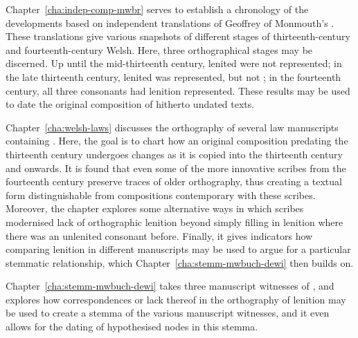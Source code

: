 Chapter~\ref{cha:indep-comp-mwbr} serves to establish a chronology of the developments based on independent translations of Geoffrey of Monmouth's . These translations give various snapshots of different stages of thirteenth-century and fourteenth-century Welsh. Here, three orthographical stages may be discerned. Up until the mid-thirteenth century, lenited  were not represented; in the late thirteenth century, lenited  was represented, but not ; in the fourteenth century, all three consonants had lenition represented. These results may be used to date the original composition of hitherto undated texts.

Chapter~\ref{cha:welsh-laws} discusses the orthography of several law manuscripts containing . Here, the goal is to chart how an original composition predating the thirteenth century undergoes changes as it is copied into the thirteenth century and onwards. It is found that even some of the more innovative scribes from the fourteenth century preserve traces of older orthography, thus creating a textual form distinguishable from compositions contemporary with these scribes. Moreover, the chapter explores some alternative ways in which scribes modernised lack of orthographic lenition beyond simply filling in lenition where there was an unlenited consonant before. Finally, it gives indicators how comparing lenition in different manuscripts may be used to argue for a particular stemmatic relationship, which Chapter~\ref{cha:stemm-mwbuch-dewi} then builds on.

Chapter~\ref{cha:stemm-mwbuch-dewi} takes three manuscript witnesses of , and explores how correspondences or lack thereof in the orthography of lenition may be used to create a stemma of the various manuscript witnesses, and it even allows for the dating of hypothesised nodes in this stemma. 


